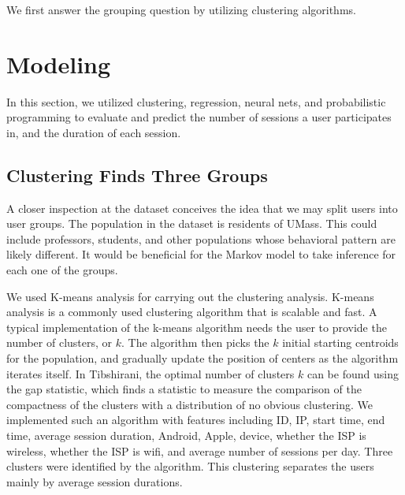 \documentclass[]{article}
\begin{document}
We first answer the grouping question by utilizing clustering algorithms.


\newpage

\section{Modeling}
In this section, we utilized clustering, regression, neural nets, and probabilistic programming to evaluate and predict the number of sessions a user participates in, and the duration of each session.

\subsection{Clustering Finds Three Groups}
A closer inspection at the dataset conceives the idea that we may split users into user groups. The population in the dataset is residents of UMass. This could include professors, students, and other populations whose behavioral pattern are likely different. It would be beneficial for the Markov model to take inference for each one of the groups. 

We used K-means analysis for carrying out the clustering analysis. K-means analysis is a commonly used clustering algorithm that is scalable and fast. A typical implementation of the k-means algorithm needs the user to provide the number of clusters, or $k$. The algorithm then picks the $k$ initial starting centroids for the population, and gradually update the position of centers as the algorithm iterates itself. In Tibshirani\cite{tibshirani}, the optimal number of clusters $k$ can be found using the gap statistic, which finds a statistic to measure the comparison of the compactness of the clusters with a distribution of no obvious clustering. We implemented such an algorithm with features including ID, IP, start time, end time, average session duration, Android, Apple, device, whether the ISP is wireless, whether the ISP is wifi, and average number of sessions per day. Three clusters were identified by the algorithm. This clustering separates the users mainly by average session durations. 
\end{document}
